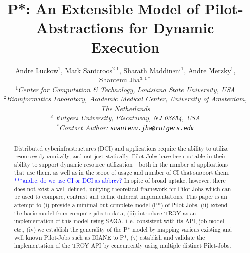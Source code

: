 \documentclass[conference,final]{IEEEtran}
\title{P*: An Extensible Model of Pilot-Abstractions for Dynamic Execution}
\date{}
\newcommand{\alnote}[1]{ {\textcolor{blue} { ***andre: #1 }}}
\newcommand{\alnote}[1]{}
\newcommand{\up}{\vspace*{-1em}}
\newcommand{\upp}{\vspace*{-0.5em}}
\begin{document}
\ifpdf
{}
\else
{}
\fi

\author{
  Andre Luckow$^{1}$, Mark Santcroos$^{2,1}$, Sharath Maddineni$^{1}$, Andre Merzky$^{1}$, Shantenu Jha$^{3,1*}$\\
  \small{\emph{$^{1}$Center for Computation \& Technology, Louisiana State University, USA}}\\
 \small{\emph{$^{2}$Bioinformatics Laboratory, Academic Medical Center, University of Amsterdam, The Netherlands}}\\
 \small{\emph{$^{3}$ Rutgers University, Piscataway, NJ 08854, USA}}\\
  \small{\emph{$^{*}$Contact Author: \texttt{shantenu.jha@rutgers.edu}}}\\
  \up\up\up\up }

\maketitle

\begin{abstract}
  Distributed cyberinfrastructures (DCI) and applications require the ability
  to utilize resources dynamically, and not just statically.  Pilot-Jobs
  have been notable in their ability to support dynamic resource
  utilization -- both in the number of applications that use them, as
  well as in the scope of usage and number of CI that support them.\alnote{do we 
  use CI or DCI as abbrev?}
  In spite of broad uptake, however, there does not exist a well
  defined, unifying theoretical framework for Pilot-Jobs which can be
  used to compare, contrast and define different implementations. This
  paper is an attempt to (i) provide a minimal but complete model (P*)
  of Pilot-Jobs, (ii) extend the basic model from compute jobs to
  data, (iii) introduce TROY as an implementation of this model using
  SAGA, i.\,e.\ consistent with its API, job-model etc., (iv) we
  establish the generality of the P* model by mapping various existing
  and well known Pilot-Jobs such as DIANE to P*, (v) establish and
  validate the implementation of the TROY API by concurrently using
  multiple distinct Pilot-Jobs.\upp\upp\upp\upp
\end{abstract}
\end{document}
